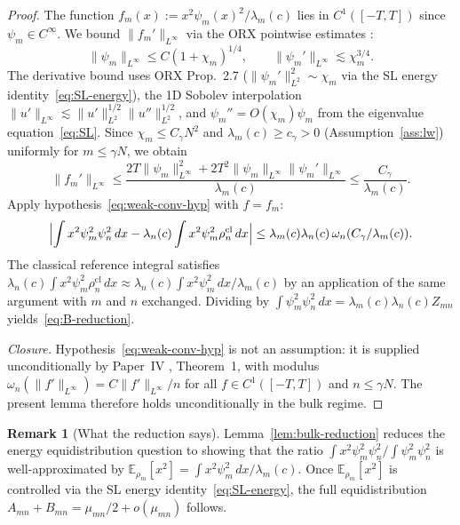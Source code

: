 \documentclass[12pt,a4paper]{amsart}
\theoremstyle{definition}
\newtheorem{remark}[theorem]{Remark}
\newcommand{\mumN}{\mu_{mn}}
\newcommand{\rhocl}{\rho_n^{\mathrm{cl}}}
\begin{document}
\begin{proof}
The function $f_m(x) := x^2\psi_m(x)^2/\lambda_m(c)$
lies in $C^1([-T,T])$ since $\psi_m \in C^\infty$.
We bound $\|f_m'\|_{L^\infty}$ via the ORX pointwise estimates
\cite[Prop.~2.5, Prop.~2.7]{OsipovRokhlinXiao}:
\[
  \|\psi_m\|_{L^\infty} \le C(1+\chi_m)^{1/4},
  \qquad
  \|\psi_m'\|_{L^\infty} \lesssim \chi_m^{3/4}.
\]
The derivative bound uses ORX Prop.~2.7 ($\|\psi_m'\|_{L^2}^2 \sim \chi_m$
via the SL energy identity~\eqref{eq:SL-energy}), the 1D Sobolev
interpolation $\|u'\|_{L^\infty} \lesssim \|u'\|_{L^2}^{1/2}\|u''\|_{L^2}^{1/2}$,
and $\psi_m'' = O(\chi_m)\psi_m$ from the eigenvalue equation~\eqref{eq:SL}.
Since $\chi_m \le C_\gamma N^2$ and $\lambda_m(c) \ge c_\gamma > 0$
(Assumption~\ref{ass:lw}) uniformly for $m \le \gamma N$, we obtain
\[
  \|f_m'\|_{L^\infty}
  \le \frac{2T\|\psi_m\|_{L^\infty}^2
            + 2T^2\|\psi_m\|_{L^\infty}\|\psi_m'\|_{L^\infty}}
           {\lambda_m(c)}
  \le \frac{C_\gamma}{\lambda_m(c)}.
\]
Apply hypothesis~\eqref{eq:weak-conv-hyp} with $f = f_m$:
\[
  \Bigl|\int x^2\psi_m^2\psi_n^2\,dx
    - \lambda_n(c)\int x^2\psi_m^2\rhocl\,dx\Bigr|
  \le \lambda_m(c)\lambda_n(c)\,\omega_n(C_\gamma/\lambda_m(c)).
\]
The classical reference integral satisfies
$\lambda_n(c)\int x^2\psi_m^2\rhocl\,dx
\approx \lambda_n(c)\int x^2\psi_m^2\,dx / \lambda_m(c)$
by an application of the same argument with $m$ and $n$ exchanged.
Dividing by $\int\psi_m^2\psi_n^2\,dx = \lambda_m(c)\lambda_n(c)Z_{mn}$
yields~\eqref{eq:B-reduction}.

\emph{Closure.}
Hypothesis~\eqref{eq:weak-conv-hyp} is not an assumption:
it is supplied unconditionally by Paper~IV \cite{PaperIV},
Theorem~1, with modulus $\omega_n(\|f'\|_{L^\infty}) = C\|f'\|_{L^\infty}/n$
for all $f \in C^1([-T,T])$ and $n \le \gamma N$.
The present lemma therefore holds unconditionally in the bulk regime.
\end{proof}

\begin{remark}[What the reduction says]\label{rem:bulk-reduction-meaning}
Lemma~\ref{lem:bulk-reduction} reduces the energy equidistribution
question to showing that the ratio
$\int x^2\psi_m^2\psi_n^2 / \int\psi_m^2\psi_n^2$
is well-approximated by $\mathbb{E}_{\rho_m}[x^2]
= \int x^2\psi_m^2\,dx/\lambda_m(c)$.
Once $\mathbb{E}_{\rho_m}[x^2]$ is controlled via the SL energy
identity~\eqref{eq:SL-energy}, the full equidistribution
$A_{mn}+B_{mn} = \mumN/2 + o(\mumN)$ follows.
\end{remark}
\end{document}
